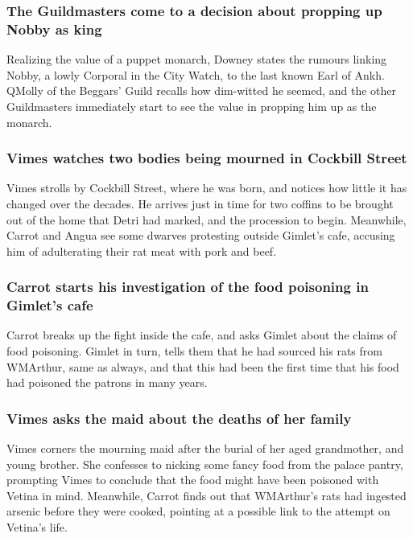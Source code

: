 \subsubsection{The Guildmasters come to a decision about propping up \Gls{Nobby} as king}
Realizing the value of a puppet monarch, \Gls{Downey} states the rumours linking \Gls{Nobby}, a
lowly Corporal in the City Watch, to the last known Earl of Ankh. \Gls{QMolly} of the Beggars' Guild
recalls how dim-witted he seemed, and the other Guildmasters immediately start to see the value in
propping him up as the monarch.

\subsubsection{\Gls{Vimes} watches two bodies being mourned in Cockbill Street}
\Gls{Vimes} strolls by Cockbill Street, where he was born, and notices how little it has changed
over the decades. He arrives just in time for two coffins to be brought out of the home that
\Gls{Detri} had marked, and the procession to begin. Meanwhile, \Gls{Carrot} and \Gls{Angua} see
some dwarves protesting outside \Gls{Gimlet}'s cafe, accusing him of adulterating their rat meat
with pork and beef.

\subsubsection{\Gls{Carrot} starts his investigation of the food poisoning in \Gls{Gimlet}'s cafe}
\Gls{Carrot} breaks up the fight inside the cafe, and asks \Gls{Gimlet} about the claims of food
poisoning. \Gls{Gimlet} in turn, tells them that he had sourced his rats from \Gls{WMArthur}, same
as always, and that this had been the first time that his food had poisoned the patrons in many
years.

\subsubsection{\Gls{Vimes} asks the maid about the deaths of her family}
\Gls{Vimes} corners the mourning maid after the burial of her aged grandmother, and young brother.
She confesses to nicking some fancy food from the palace pantry, prompting \Gls{Vimes} to conclude
that the food might have been poisoned with \Gls{Vetina} in mind. Meanwhile, \Gls{Carrot} finds out
that \Gls{WMArthur}'s rats had ingested arsenic before they were cooked, pointing at a possible link
to the attempt on \Gls{Vetina}'s life.

